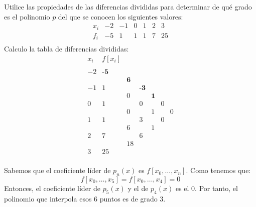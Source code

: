 \begin{ejercicio}
    Utilice las propiedades de las diferencias divididas para determinar de qué grado es el polinomio $p$ del que se conocen los siguientes valores:
    \begin{equation*}
        \begin{array}{c|ccccccc}
            x_i & -2 & -1 & 0 & 1 & 2 & 3 \\ \hline
            f_i & -5 & 1 & 1 & 1 & 7 & 25 \\
        \end{array}
    \end{equation*}
    Calculo la tabla de diferencias divididas:
    \begin{equation*}
        \begin{array}{c|cccccc}
            x_i & f[x_i] \\
            \\
            -2 & \textbf{-5} \\
            && \textbf{6}\\
            -1 & 1 && \textbf{-3}\\
            && 0&&\mathbf{1}\\
            0 & 1 && 0 && 0\\
            && 0 && 1 && 0\\
            1 & 1 && 3 && 0\\
            && 6 && 1\\
            2 & 7 && 6\\
            && 18  && \\
            3 & 25\\
        \end{array}
    \end{equation*}

    Sabemos que el coeficiente líder de $p_{n}(x)$ es $f[x_0,\dots,x_n]$. Como tenemos que:
    \begin{equation*}
        f[x_0,\dots,x_5] = f[x_0,\dots,x_4] = 0
    \end{equation*}
    Entonces, el coeficiente líder de $p_{5}(x)$ y el de $p_{4}(x)$ es el 0. Por tanto, el polinomio que interpola esos 6 puntos es de grado 3.
\end{ejercicio}

